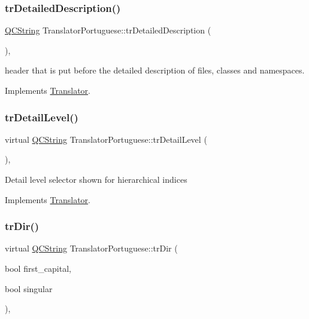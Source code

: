 \subsubsection{\texorpdfstring{trDetailedDescription()}{trDetailedDescription()}}
{\footnotesize\ttfamily \mbox{\hyperlink{class_q_c_string}{Q\+C\+String}} Translator\+Portuguese\+::tr\+Detailed\+Description (\begin{DoxyParamCaption}{ }\end{DoxyParamCaption})\hspace{0.3cm}{\ttfamily [inline]}, {\ttfamily [virtual]}}

header that is put before the detailed description of files, classes and namespaces. 

Implements \mbox{\hyperlink{class_translator}{Translator}}.

\mbox{\label{class_translator_portuguese_a29bd2f2c39e5cc12b1309dff04a21244}} 
\subsubsection{\texorpdfstring{trDetailLevel()}{trDetailLevel()}}
{\footnotesize\ttfamily virtual \mbox{\hyperlink{class_q_c_string}{Q\+C\+String}} Translator\+Portuguese\+::tr\+Detail\+Level (\begin{DoxyParamCaption}{ }\end{DoxyParamCaption})\hspace{0.3cm}{\ttfamily [inline]}, {\ttfamily [virtual]}}

Detail level selector shown for hierarchical indices 

Implements \mbox{\hyperlink{class_translator}{Translator}}.

\mbox{\label{class_translator_portuguese_a56f16c40c6518a8c0b05415a4dbacfd2}} 
\subsubsection{\texorpdfstring{trDir()}{trDir()}}
{\footnotesize\ttfamily virtual \mbox{\hyperlink{class_q_c_string}{Q\+C\+String}} Translator\+Portuguese\+::tr\+Dir (\begin{DoxyParamCaption}\item[{bool}]{first\+\_\+capital,  }\item[{bool}]{singular }\end{DoxyParamCaption})\hspace{0.3cm}{\ttfamily [inline]}, {\ttfamily [virtual]}}


